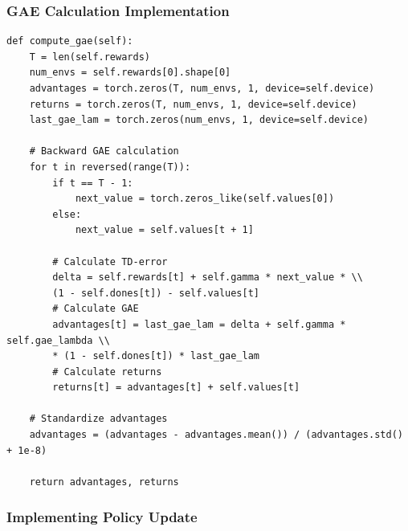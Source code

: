\documentclass[12pt]{article}
\begin{document}
\subsubsection{GAE Calculation Implementation}

\begin{verbatim}
def compute_gae(self):
    T = len(self.rewards)
    num_envs = self.rewards[0].shape[0]
    advantages = torch.zeros(T, num_envs, 1, device=self.device)
    returns = torch.zeros(T, num_envs, 1, device=self.device)
    last_gae_lam = torch.zeros(num_envs, 1, device=self.device)
    
    # Backward GAE calculation
    for t in reversed(range(T)):
        if t == T - 1:
            next_value = torch.zeros_like(self.values[0])
        else:
            next_value = self.values[t + 1]
        
        # Calculate TD-error
        delta = self.rewards[t] + self.gamma * next_value * \\
        (1 - self.dones[t]) - self.values[t]
        # Calculate GAE
        advantages[t] = last_gae_lam = delta + self.gamma * self.gae_lambda \\
        * (1 - self.dones[t]) * last_gae_lam
        # Calculate returns
        returns[t] = advantages[t] + self.values[t]
    
    # Standardize advantages
    advantages = (advantages - advantages.mean()) / (advantages.std() + 1e-8)
    
    return advantages, returns
\end{verbatim}

\subsubsection{Implementing Policy Update}
\end{document}

